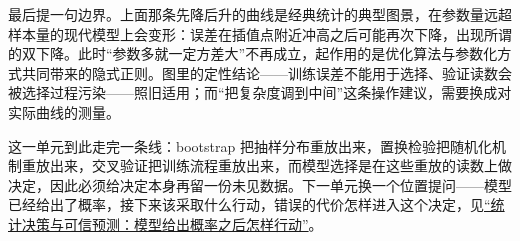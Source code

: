 最后提一句边界。上面那条先降后升的曲线是经典统计的典型图景，在参数量远超样本量的现代模型上会变形：误差在插值点附近冲高之后可能再次下降，出现所谓的双下降。此时``参数多就一定方差大''不再成立，起作用的是优化算法与参数化方式共同带来的隐式正则。图里的定性结论——训练误差不能用于选择、验证读数会被选择过程污染——照旧适用；而``把复杂度调到中间''这条操作建议，需要换成对实际曲线的测量。

这一单元到此走完一条线：bootstrap 把抽样分布重放出来，置换检验把随机化机制重放出来，交叉验证把训练流程重放出来，而模型选择是在这些重放的读数上做决定，因此必须给决定本身再留一份未见数据。下一单元换一个位置提问——模型已经给出了概率，接下来该采取什么行动，错误的代价怎样进入这个决定，见\hyperref[ch:092]{``统计决策与可信预测：模型给出概率之后怎样行动''}。

